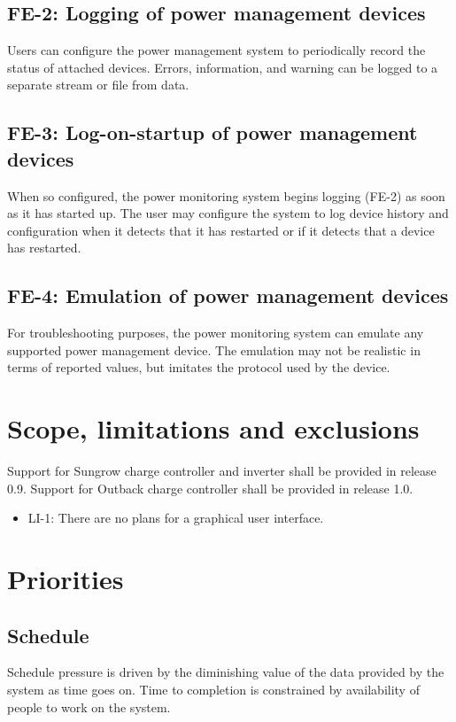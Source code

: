 \documentclass[pdftex,oneside,12pt,a4paper]{book}
\begin{document}
\subsection{FE-2: Logging of power management devices}
Users can configure the power management system to periodically record the status of attached devices.  Errors, information, and warning can be logged to a separate stream or file from data.

\subsection{FE-3: Log-on-startup of power management devices}
When so configured, the power monitoring system begins logging (FE-2) as soon as it has started up.  The user may configure the system to log device history and configuration when it detects that it has restarted or if it detects that a device has restarted.

\subsection{FE-4: Emulation of power management devices}
For troubleshooting purposes, the power monitoring system can emulate any supported power management device.  The emulation may not be realistic in terms of reported values, but imitates the protocol used by the device.


\section{Scope, limitations and exclusions}
Support for Sungrow charge controller and inverter shall be provided in release 0.9.  Support for Outback charge controller shall be provided in release 1.0.

\begin{itemize}
\item LI-1:  There are no plans for a graphical user interface.
\end{itemize}

\section{Priorities}
\subsection{Schedule}
Schedule pressure is driven by the diminishing value of the data provided by the system as time goes on.  Time to completion is constrained by availability of people to work on the system.
\end{document}
